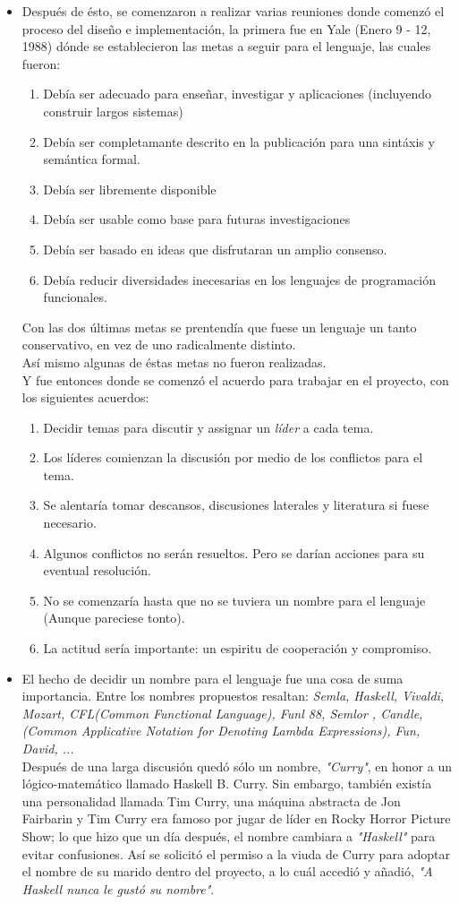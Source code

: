 \documentclass{article}
\begin{document}
\begin{itemize}
	\item Después de ésto, se comenzaron a realizar varias reuniones donde comenzó el proceso del diseño e implementación, la primera fue en Yale (Enero 9 - 12, 1988) dónde se establecieron las metas a seguir para el lenguaje, las cuales fueron:
		\begin{enumerate}
			\item Debía ser adecuado para enseñar, investigar y aplicaciones (incluyendo construir largos sistemas)
			\item Debía ser completamante descrito en la publicación para una sintáxis y semántica formal.
			\item Debía ser libremente disponible
			\item Debía ser usable como base para futuras investigaciones
			\item Debía ser basado en ideas que disfrutaran un amplio consenso.
			\item Debía reducir diversidades inecesarias en los lenguajes de programación funcionales.
		\end{enumerate}
	Con las dos últimas metas se prentendía que fuese un lenguaje un tanto conservativo, en vez de uno radicalmente distinto.\\Así mismo algunas de éstas metas no fueron realizadas.\\ Y fue entonces donde se comenzó el acuerdo para trabajar en el proyecto, con los siguientes acuerdos:
		\begin{enumerate}
			\item Decidir temas para discutir y assignar un \textit{líder} a cada tema.
			\item Los líderes comienzan la discusión por medio de los conflictos para el tema.
			\item Se alentaría tomar descansos, discusiones laterales y literatura si fuese necesario.
			\item Algunos conflictos no serán resueltos. Pero se darían acciones para su eventual resolución.
			\item No se comenzaría hasta que no se tuviera un nombre para el lenguaje (Aunque pareciese tonto).
			\item La actitud sería importante: un espiritu de cooperación y compromiso.
		\end{enumerate}
	\item El hecho de decidir un nombre para el lenguaje fue una cosa de suma importancia. Entre los nombres propuestos resaltan: \textit{Semla, Haskell, Vivaldi, Mozart, CFL(Common Functional Language), Funl 88, Semlor , Candle,(Common Applicative Notation for Denoting Lambda Expressions), Fun, David, ...}\\Después de una larga discusión quedó sólo un nombre, \textit{"Curry"}, en honor a un lógico-matemático llamado Haskell B. Curry. Sin embargo, también existía una personalidad llamada Tim Curry, una máquina abstracta de Jon Fairbarin y Tim Curry era famoso por jugar de líder en Rocky Horror Picture Show; lo que hizo que un día después, el nombre cambiara a \textit{"Haskell"} para evitar confusiones. Así se solicitó el permiso a la viuda de Curry para adoptar el nombre de su marido dentro del proyecto, a lo cuál accedió y añadió, \textit{"A Haskell nunca le gustó su nombre"}.

\end{itemize}
\end{document}
